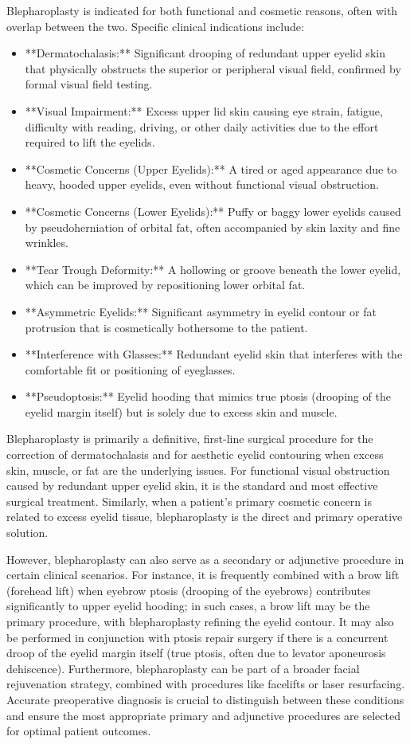 Blepharoplasty is indicated for both functional and cosmetic reasons, often with overlap between the two. Specific clinical indications include:

\begin{itemize}
  \item **Dermatochalasis:** Significant drooping of redundant upper eyelid skin that physically obstructs the superior or peripheral visual field, confirmed by formal visual field testing.
  \item **Visual Impairment:** Excess upper lid skin causing eye strain, fatigue, difficulty with reading, driving, or other daily activities due to the effort required to lift the eyelids.
  \item **Cosmetic Concerns (Upper Eyelids):** A tired or aged appearance due to heavy, hooded upper eyelids, even without functional visual obstruction.
  \item **Cosmetic Concerns (Lower Eyelids):** Puffy or baggy lower eyelids caused by pseudoherniation of orbital fat, often accompanied by skin laxity and fine wrinkles.
  \item **Tear Trough Deformity:** A hollowing or groove beneath the lower eyelid, which can be improved by repositioning lower orbital fat.
  \item **Asymmetric Eyelids:** Significant asymmetry in eyelid contour or fat protrusion that is cosmetically bothersome to the patient.
  \item **Interference with Glasses:** Redundant eyelid skin that interferes with the comfortable fit or positioning of eyeglasses.
  \item **Pseudoptosis:** Eyelid hooding that mimics true ptosis (drooping of the eyelid margin itself) but is solely due to excess skin and muscle.
\end{itemize}

Blepharoplasty is primarily a definitive, first-line surgical procedure for the correction of dermatochalasis and for aesthetic eyelid contouring when excess skin, muscle, or fat are the underlying issues. For functional visual obstruction caused by redundant upper eyelid skin, it is the standard and most effective surgical treatment. Similarly, when a patient's primary cosmetic concern is related to excess eyelid tissue, blepharoplasty is the direct and primary operative solution.

However, blepharoplasty can also serve as a secondary or adjunctive procedure in certain clinical scenarios. For instance, it is frequently combined with a brow lift (forehead lift) when eyebrow ptosis (drooping of the eyebrows) contributes significantly to upper eyelid hooding; in such cases, a brow lift may be the primary procedure, with blepharoplasty refining the eyelid contour. It may also be performed in conjunction with ptosis repair surgery if there is a concurrent droop of the eyelid margin itself (true ptosis, often due to levator aponeurosis dehiscence). Furthermore, blepharoplasty can be part of a broader facial rejuvenation strategy, combined with procedures like facelifts or laser resurfacing. Accurate preoperative diagnosis is crucial to distinguish between these conditions and ensure the most appropriate primary and adjunctive procedures are selected for optimal patient outcomes.

